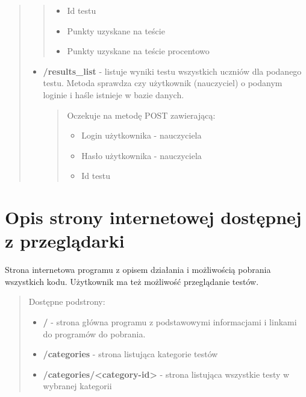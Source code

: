\documentclass[letterpaper,10pt,polish]{manual}
\begin{document}
\begin{quote}
\begin{itemize}
\begin{quote}
\begin{itemize}
\item {} 
Id testu

\item {} 
Punkty uzyskane na teście

\item {} 
Punkty uzyskane na teście procentowo

\end{itemize}
\end{quote}

\end{itemize}
\hypertarget{results-list}{}\begin{itemize}
\item {} 
\textbf{/results\_list} - listuje wyniki testu wszystkich uczniów dla podanego testu. Metoda sprawdza czy użytkownik (nauczyciel) o podanym loginie i haśle istnieje w bazie danych.
\begin{quote}

Oczekuje na metodę POST zawierającą:
\begin{itemize}
\item {} 
Login użytkownika - nauczyciela

\item {} 
Hasło użytkownika - nauczyciela

\item {} 
Id testu

\end{itemize}
\end{quote}

\end{itemize}
\end{quote}
\hypertarget{www}{}

\chapter{Opis strony internetowej dostępnej z przeglądarki}

Strona internetowa programu z opisem działania i możliwością pobrania wszystkich kodu. Użytkownik ma też możliwość przeglądanie testów.
\begin{quote}

Dostępne podstrony:
\begin{itemize}
\item {} 
\textbf{/} - strona główna programu z podstawowymi informacjami i linkami do programów do pobrania.

\item {} 
\textbf{/categories} - strona listująca kategorie testów

\item {} 
\textbf{/categories/\textless{}category-id\textgreater{}} - strona listująca wszystkie testy w wybranej kategorii

\end{itemize}
\end{quote}
\hypertarget{models}{}
\end{document}
